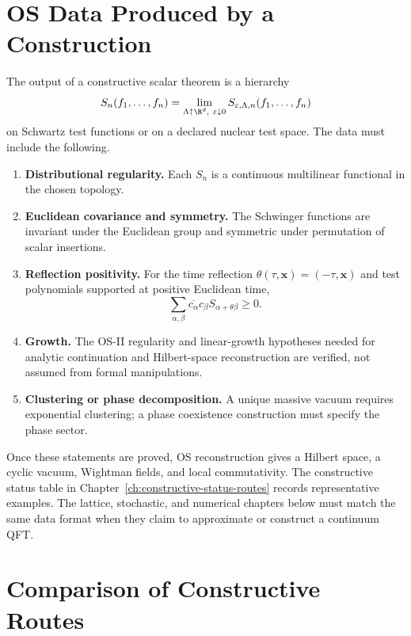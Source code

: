 \section{OS Data Produced by a Construction}

The output of a constructive scalar theorem is a hierarchy
\begin{equation}
  S_n(f_1,\ldots,f_n)
  =
  \lim_{\Lambda\uparrow\R^d,\ \varepsilon\downarrow0}
  S_{\varepsilon,\Lambda,n}(f_1,\ldots,f_n)
  \label{eq:constructive-schwinger-output}
\end{equation}
on Schwartz test functions or on a declared nuclear test space.  The data
must include the following.

\begin{enumerate}
  \item \textbf{Distributional regularity.}  Each \(S_n\) is a continuous
  multilinear functional in the chosen topology.
  \item \textbf{Euclidean covariance and symmetry.}  The Schwinger functions
  are invariant under the Euclidean group and symmetric under permutation of
  scalar insertions.
  \item \textbf{Reflection positivity.}  For the time reflection
  \(\theta(\tau,\mathbf x)=(-\tau,\mathbf x)\) and test polynomials
  supported at positive Euclidean time,
  \[
    \sum_{\alpha,\beta}
    \overline{c_\alpha}c_\beta
    S_{\alpha+\theta\beta}
    \geq0 .
  \]
  \item \textbf{Growth.}  The OS-II regularity and linear-growth hypotheses
  needed for analytic continuation and Hilbert-space reconstruction are
  verified, not assumed from formal manipulations.
  \item \textbf{Clustering or phase decomposition.}  A unique massive vacuum
  requires exponential clustering; a phase coexistence construction must
  specify the phase sector.
\end{enumerate}

Once these statements are proved, OS reconstruction gives a Hilbert space,
a cyclic vacuum, Wightman fields, and local commutativity.  The constructive
status table in Chapter~\ref{ch:constructive-status-routes} records
representative examples.  The lattice, stochastic, and numerical chapters
below must match the same data format when they claim to approximate or
construct a continuum QFT.

\section{Comparison of Constructive Routes}

